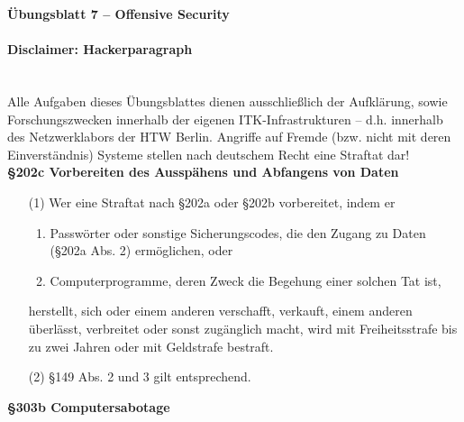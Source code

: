 \documentclass[paper=a4,fontsize=11pt]{scrartcl}%
\numberwithin{equation}{section}
\begin{document}
\begin{center}
\Large{\textbf{Übungsblatt 7 -- Offensive Security}}
\end{center}
\paragraph{Disclaimer: \glqq Hackerparagraph\grqq}~\\
Alle Aufgaben dieses Übungsblattes dienen ausschließlich der Aufklärung, sowie Forschungszwecken innerhalb der eigenen ITK-Infrastrukturen -- d.h. innerhalb des Netzwerklabors der HTW Berlin. Angriffe auf Fremde (bzw. nicht mit deren Einverständnis) Systeme stellen nach deutschem Recht eine Straftat dar!\\
\textbf{\S 202c Vorbereiten des Ausspähens und Abfangens von Daten}
\begin{enumerate}
	\item[(1)] Wer eine Straftat nach \S 202a oder \S 202b vorbereitet, indem er
	\begin{enumerate}
		\item Passwörter oder sonstige Sicherungscodes, die den Zugang zu Daten (\S 202a Abs. 2) ermöglichen, oder
		\item Computerprogramme, deren Zweck die Begehung einer solchen Tat ist,
	\end{enumerate}
	herstellt, sich oder einem anderen verschafft, verkauft, einem anderen überlässt, verbreitet oder sonst zugänglich macht, wird mit Freiheitsstrafe bis zu zwei Jahren oder mit Geldstrafe bestraft.
	\item[(2)]  \S 149 Abs. 2 und 3 gilt entsprechend.
\end{enumerate}
\textbf{\S 303b Computersabotage}
\end{document}
